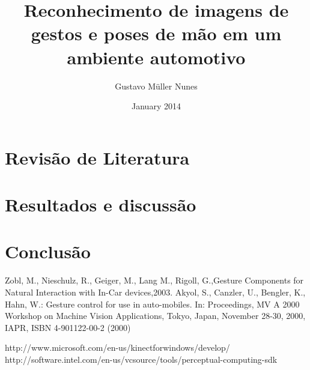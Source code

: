 \documentclass[a4paper,11pt,oneside]{book}
\begin{document}
\author{Gustavo Müller Nunes}
\title{Reconhecimento de imagens de gestos e poses de mão em um ambiente automotivo}
\date{January 2014}

\maketitle
\tableofcontents 	%
\listoftables 		%
\listoffigures 		%

%

\chapter{Revisão de Literatura}


\chapter{Resultados e discussão}
\chapter{Conclusão}

\begin{thebibliography}{2}
 
 Zobl, M., Nieschulz, R., Geiger, M., Lang M., Rigoll, G.,{Gesture Components for Natural Interaction with In-Car devices},2003.
 Akyol, S., Canzler, U., Bengler, K., Hahn, W.: Gesture control for use in auto-mobiles. In: Proceedings, MV A 2000 Workshop on Machine Vision Applications, Tokyo, Japan, November 28-30, 2000, IAPR, ISBN 4-901122-00-2 (2000)
 
 http://www.microsoft.com/en-us/kinectforwindows/develop/
 http://software.intel.com/en-us/vcsource/tools/perceptual-computing-sdk

\end{thebibliography}
\end{document}
